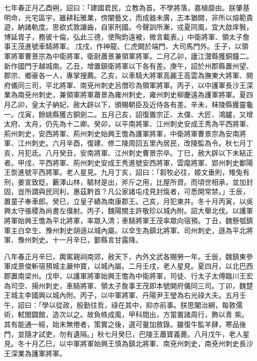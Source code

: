 \begin{pinyinscope}
 七年春正月乙酉朔，詔曰：「建國君民，立教為首。不學將落，嘉植靡由。朕肇基明命，光宅區宇，雖耕耘雅業，傍闡藝文，而成器未廣，志本猶闕，非所以熔範貴遊，納諸軌度。思欲式敦讓齒，自家刑國。今聲訓所漸，戎夏同風，宜大啟庠斅，博延胄子，務彼十倫，弘此三德，使陶鈞遠被，微言載表。」中衛將軍、領太子詹事王茂進號車騎將軍。
 戊戌，作神龍、仁虎闕於端門、大司馬門外。壬子，以領軍將軍曹景宗為中衛將軍，衛尉蕭景兼領軍將軍。二月乙卯，廬江灊縣獲銅鐘二。新作國門于越城南。乙丑，增置鎮衛將軍以下各有差。庚午，詔於州郡縣置州望、郡宗、鄉豪各一人，專掌搜薦。乙亥，以車騎大將軍高麗王高雲為撫東大將軍、開府儀同三司，平北將軍、南兗州刺史呂僧珍為領軍將軍。丙子，以中護軍長沙王深業為南兗州刺史，兼領軍將軍蕭景為雍州刺史，雍州刺史柳慶遠為護軍將軍。夏四月乙卯，皇太子納妃，赦大辟以下，頒賜朝臣及近侍各有差。辛未，秣陵縣獲靈龜
 一。戊寅，餘姚縣獲古銅劍二。五月己亥，詔復置宗正、太僕、大匠、鴻臚，又增太府、太舟，仍先為十二卿。癸卯，以平南將軍、江州刺史安成王秀為平西將軍、荊州刺史，安西將軍、荊州刺史始興王憺為護軍將軍，中衛將軍曹景宗為安南將軍、江州刺史。六月辛酉，復建、修二陵周回五里內居民，改陵監為令。秋七月丁亥，月犯氐。八月癸丑，安南將軍、江州刺史曹景宗卒。丁巳，赦大辟以下未結正者。甲戌，平西將軍、荊州刺史安成王秀進號安西將軍，雲麾將軍、郢州刺史鄱陽王恢進號平西將軍。老人星見。九月丁亥，詔曰：「芻牧必往，姬文垂則，雉兔有
 刑，姜宣致貶。藪澤山林，毓材是出，斧斤之用，比屋所資。而頃世相承，並加封固，豈所謂與民同利，惠茲黔首？凡公家諸屯戍見封熂者，可悉開常禁。」壬辰，置童子奉車郎。癸巳，立皇子績為南康郡王。己亥，月犯東井。冬十月丙寅，以吳興太守張稷為尚書左僕射。丙子，魏陽關主許敬珍以城內附。詔大舉北伐。以護軍將軍始興王憺為平北將軍，率眾入清；車騎將軍王茂率眾向宿預。丁丑，魏懸瓠鎮軍主白皁生、豫州刺史胡遜以城內屬。以皁生為鎮北將軍、司州刺史，遜為平北將軍、豫州刺史。十一月辛巳，鄞縣言甘露降。



 八年春正月辛巳，輿駕親祠南郊，赦天下，內外文武各賜勞一年。壬辰，魏鎮東參軍成景俊斬宿預城主嚴仲寶，以城內屬。二月壬戌，老人星見。夏四月，以北巴西郡置南梁州。戊申，以護軍將軍始興王憺為中衛將軍，司徒、行太子太傅臨川王宏為司空、揚州刺史，車騎將軍、領太子詹事王茂即本號開府儀同三司。丁卯，魏楚王城主李國興以城內附。丙子，以中軍將軍、丹陽尹王瑩為右光祿大夫。五月壬午，詔曰：「學以從政，殷勤往哲，祿在其中，抑亦前事。朕思闡治綱，每敦儒術，軾閭闢館，造次以之。故負帙成風，甲科間出，方當置諸周行，飾以青
 紫。其有能通一經，始末無倦者，策實之後，選可量加敘錄。雖復牛監羊肆，寒品後門，並隨才試吏，勿有遺隔。」秋七月癸巳，巴陵王蕭寶義薨。八月戊午，老人星見。冬十月乙巳，以中軍將軍始興王慎為鎮北將軍、南兗州刺史，南兗州刺史長沙王深業為護軍將軍。




\end{pinyinscope}
